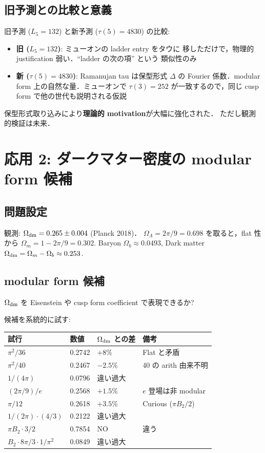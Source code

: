 \documentclass[11pt,a4paper]{article}
\begin{document}
\subsection{旧予測との比較と意義}

旧予測 ($L_5 = 132$) と新予測 ($\tau(5) = 4830$) の比較:

\begin{itemize}
\item \textbf{旧 ($L_5 = 132$)}: ミューオンの ladder entry をタウに
移しただけで，物理的 justification 弱い．``ladder の次の項'' という
類似性のみ
\item \textbf{新 ($\tau(5) = 4830$)}: Ramanujan tau は保型形式 $\Delta$
の Fourier 係数．modular form 上の自然な量．ミューオンで $\tau(3)
= 252$ が一致するので，同じ cusp form で他の世代も説明される仮説
\end{itemize}

保型形式取り込みにより\textbf{理論的 motivation}が大幅に強化された．
ただし観測的検証は未来．

\section{応用 2: ダークマター密度の modular form 候補}

\subsection{問題設定}

観測: $\Omega_{\rm dm} = 0.265 \pm 0.004$ (Planck 2018)．
$\Omega_\Lambda = 2\pi/9 = 0.698$ を取ると，flat 性から $\Omega_m = 1 - 2\pi/9 = 0.302$.
Baryon $\Omega_b \approx 0.0493$, Dark matter $\Omega_{\rm dm} = \Omega_m - \Omega_b \approx 0.253$.

\subsection{modular form 候補}

$\Omega_{\rm dm}$ を Eisenstein や cusp form coefficient で表現できるか?

候補を系統的に試す:

\begin{center}
\begin{tabular}{llll}
\toprule
試行 & 数値 & $\Omega_{\rm dm}$ との差 & 備考 \\
\midrule
$\pi^2/36$ & 0.2742 & $+8\%$ & Flat と矛盾 \\
$\pi^2/40$ & 0.2467 & $-2.5\%$ & 40 の arith 由来不明 \\
$1/(4\pi)$ & 0.0796 & 違い過大 & \\
$(2\pi/9)/e$ & 0.2568 & $+1.5\%$ & $e$ 登場は非 modular \\
$\pi/12$ & 0.2618 & $+3.5\%$ & Curious ($\pi B_2/2$) \\
$1/(2\pi) \cdot (4/3)$ & 0.2122 & 違い過大 & \\
$\pi B_2 \cdot 3/2$ & 0.7854 & NO & 違う \\
$B_2 \cdot 8\pi/3 \cdot 1/\pi^2$ & 0.0849 & 違い過大 & \\
\bottomrule
\end{tabular}
\end{center}
\end{document}
